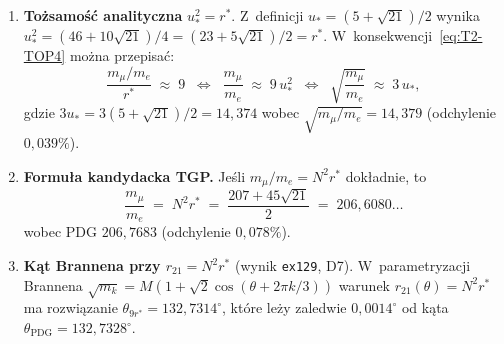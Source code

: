\begin{enumerate}
  \item \textbf{To\.zsamo\'s\'c analityczna} $u_*^2 = r^*$.
    Z~definicji $u_* = (5+\sqrt{21})/2$ wynika
    $u_*^2 = (46+10\sqrt{21})/4 = (23+5\sqrt{21})/2 = r^*$.
    W~konsekwencji~\eqref{eq:T2-TOP4} mo\.zna przepisa\'c:
    \[
      \frac{m_\mu/m_e}{r^*} \;\approx\; 9
      \;\;\Longleftrightarrow\;\;
      \frac{m_\mu}{m_e} \;\approx\; 9\,u_*^2
      \;\;\Longleftrightarrow\;\;
      \sqrt{\frac{m_\mu}{m_e}} \;\approx\; 3\,u_*,
    \]
    gdzie $3u_* = 3(5+\sqrt{21})/2 = 14{,}374$ wobec
    $\sqrt{m_\mu/m_e} = 14{,}379$ (odchylenie $0{,}039\%$).

  \item \textbf{Formu\l{}a kandydacka TGP.}
    Je\'sli $m_\mu/m_e = N^2 r^*$ dok\l{}adnie, to
    \begin{equation}\label{eq:T2-TOP4-candidate}
      \frac{m_\mu}{m_e}
      \;=\; N^2 r^*
      \;=\; \frac{207 + 45\sqrt{21}}{2}
      \;=\; 206{,}6080\ldots
    \end{equation}
    wobec PDG $206{,}7683$ (odchylenie $0{,}078\%$).

  \item \textbf{K\k{a}t Brannena przy $r_{21}=N^2 r^*$} (wynik \texttt{ex129}, D7).
    W~parametryzacji Brannena
    $\sqrt{m_k} = M(1 + \sqrt{2}\cos(\theta+2\pi k/3))$
    warunek $r_{21}(\theta) = N^2 r^*$ ma rozwi\k{a}zanie
    $\theta_{9r^*} = 132{,}7314^\circ$,
    kt\'ore le\.zy zaledwie $0{,}0014^\circ$ od k\k{a}ta
    $\theta_{\mathrm{PDG}} = 132{,}7328^\circ$.


\end{enumerate}
